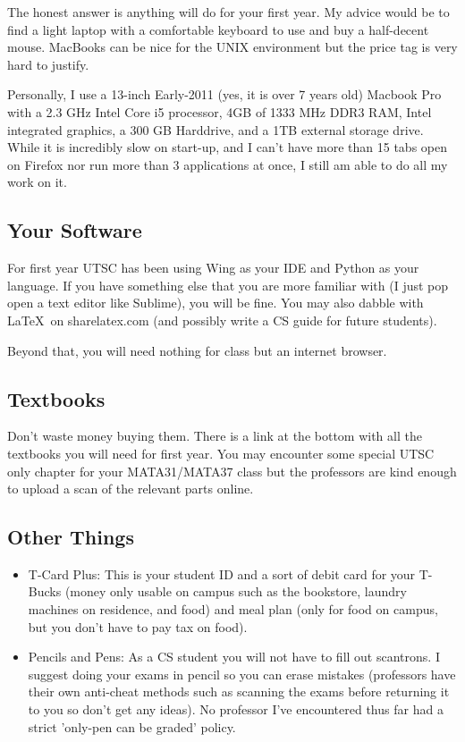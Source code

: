 \documentclass[11pt]{article}
\begin{document}
The honest answer is anything will do for your first year. My advice
would be to find a light laptop with a comfortable keyboard to use and
buy a half-decent mouse. MacBooks can be nice for the UNIX environment
but the price tag is very hard to justify.

Personally, I use a 13-inch Early-2011 (yes, it is over 7 years old)
Macbook Pro with a 2.3 GHz Intel Core i5 processor, 4GB of 1333 MHz DDR3
RAM, Intel integrated graphics, a 300 GB Harddrive, and a 1TB external
storage drive. While it is incredibly slow on start-up, and I can't
have more than 15 tabs open on Firefox nor run more than 3 applications
at once, I still am able to do all my work on it. 

\subsection{Your Software}
For first year UTSC has been using Wing as your IDE and Python as your
language. If you have something else that you are more familiar with (I
just pop open a text editor like Sublime), you will be fine. You may
also dabble with \LaTeX\ on sharelatex.com (and possibly write a CS
guide for future students). 

Beyond that, you will need nothing for class
but an internet browser.

\subsection{Textbooks}
Don't waste money buying them. There is a link at the bottom with
all the textbooks you will need for first year. You may encounter
some special UTSC only chapter for your MATA31/MATA37 class but the
professors are kind enough to upload a scan of the relevant parts
online.

\subsection{Other Things}
\begin{itemize}
    \item T-Card Plus: This is your student ID and a sort of debit card
        for your T-Bucks (money only usable on campus such as the bookstore,
        laundry machines on residence, and food) and meal plan (only for food 
        on campus, but you don't have to pay tax on food).
    \item Pencils and Pens: As a CS student you will not have to
        fill out scantrons. I suggest doing your exams in pencil so you can
        erase mistakes (professors have their own anti-cheat methods such as
        scanning the exams before returning it to you so don't get any ideas).
        No professor I've encountered thus far had a strict 'only-pen can be
        graded' policy.
\end{itemize}
\end{document}
